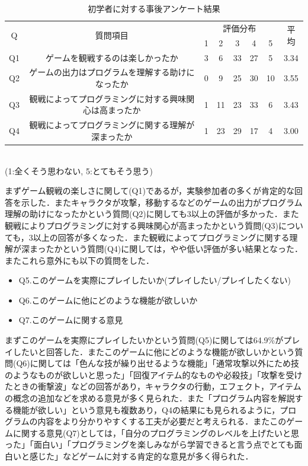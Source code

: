 \begin{table}[h]
  \begin{center}
    \caption{初学者に対する事後アンケート結果}
    \label{beginner_interview}
      \begin{tabular}{|c|c|c|c|c|c|c|c|} \hline
        \multirow{2}{*}{Q} & \multirow{2}{*}{質問項目} & \multicolumn{5}{c}{評価分布} & \multirow{2}{*}{平均} \\
        & & 1 & 2 & 3 & 4 & 5 & \\ \hline\hline
        Q1 & ゲームを観戦するのは楽しかったか & 3 & 6 & 33 & 27 & 5 & 3.34\\ \hline
        Q2 & ゲームの出力はプログラムを理解する助けになったか & 0 & 9 & 25 & 30 & 10 & 3.55\\ \hline
        Q3 & 観戦によってプログラミングに対する興味関心は高まったか & 1 & 11 & 23 & 33 & 6 & 3.43\\ \hline
        Q4 & 観戦によってプログラミングに関する理解が深まったか & 1 & 23 & 29 & 17 & 4 & 3.00\\ \hline
      \end{tabular}
      \\(1:全くそう思わない, 5:とてもそう思う)
  \end{center}
\end{table}

まずゲーム観戦の楽しさに関して(Q1)であるが，実験参加者の多くが肯定的な回答を示した．またキャラクタが攻撃，移動するなどのゲームの出力がプログラム理解の助けになったかという質問(Q2)に関しても3以上の評価が多かった．また観戦によりプログラミングに対する興味関心が高まったかという質問(Q3)についても，3以上の回答が多くなった．また観戦によってプログラミングに関する理解が深まったかという質問(Q4)に関しては，やや低い評価が多い結果となった．またこれら意外にも以下の質問をした．

\begin{itemize}
  \item Q5.このゲームを実際にプレイしたいか(プレイしたい/プレイしたくない)
  \item Q6.このゲームに他にどのような機能が欲しいか
  \item Q7.このゲームに関する意見
\end{itemize}

まずこのゲームを実際にプレイしたいかという質問(Q5)に関しては64.9\%がプレイしたいと回答した．またこのゲームに他にどのような機能が欲しいかという質問(Q6)に関しては「色んな技が繰り出せるような機能」「通常攻撃以外にため技のようなものが欲しいと思った」「回復アイテム的なものや必殺技」「攻撃を受けたときの衝撃波」などの回答があり，キャラクタの行動，エフェクト，アイテムの概念の追加などを求める意見が多く見られた．また「プログラム内容を解説する機能が欲しい」という意見も複数あり，Q4の結果にも見られるように，プログラムの内容をより分かりやすくする工夫が必要だと考えられる．またこのゲームに関する意見(Q7)としては，「自分のプログラミングのレベルを上げたいと思った」「面白い」「プログラミングを楽しみながら学習できると言う点でとても面白いと感じた」などゲームに対する肯定的な意見が多く得られた．

